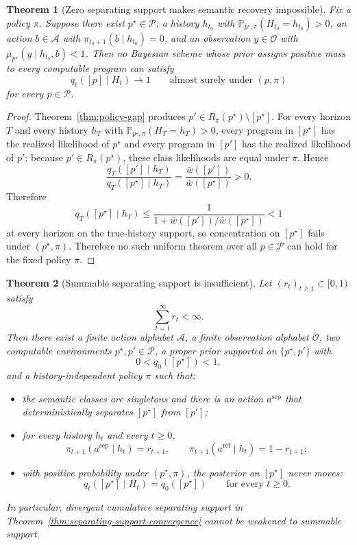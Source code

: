\documentclass[11pt]{article}
\newtheorem{theorem}{Theorem}[section]
\theoremstyle{definition}
\theoremstyle{remark}
\newcommand{\Acal}{\mathcal{A}}
\newcommand{\Ocal}{\mathcal{O}}
\newcommand{\Pcal}{\mathcal{P}}
\newcommand{\Prob}{\mathbb{P}}
\begin{document}
\begin{theorem}[Zero separating support makes semantic recovery impossible]
\label{cor:support-necessary}
Fix a policy $\pi$. Suppose there exist $p^\star\in\Pcal$, a history $h_{t_0}$ with $\Prob_{p^\star,\pi}(H_{t_0}=h_{t_0})>0$, an action $b\in\Acal$ with $\pi_{t_0+1}(b\mid h_{t_0})=0$, and an observation $y\in\Ocal$ with $\mu_{p^\star}(y\mid h_{t_0},b)<1$. Then no Bayesian scheme whose prior assigns positive mass to every computable program can satisfy
\[
q_t([p]\mid H_t)\longrightarrow 1
\qquad\text{almost surely under }(p,\pi)
\]
for every $p\in\Pcal$.
\end{theorem}

\begin{proof}
Theorem~\ref{thm:policy-gap} produces $p'\in R_\pi(p^\star)\setminus[p^\star]$. For every horizon $T$ and every history $h_T$ with $\Prob_{p^\star,\pi}(H_T=h_T)>0$, every program in $[p^\star]$ has the realized likelihood of $p^\star$ and every program in $[p']$ has the realized likelihood of $p'$; because $p'\in R_\pi(p^\star)$, these class likelihoods are equal under $\pi$. Hence
\[
\frac{q_T([p']\mid h_T)}{q_T([p^\star]\mid h_T)}
=
\frac{\bar w([p'])}{\bar w([p^\star])}
>0.
\]
Therefore
\[
q_T([p^\star]\mid h_T)\le \frac{1}{1+\bar w([p'])/\bar w([p^\star])}<1
\]
at every horizon on the true-history support, so concentration on $[p^\star]$ fails under $(p^\star,\pi)$. Therefore no such uniform theorem over all $p\in\Pcal$ can hold for the fixed policy $\pi$.
\end{proof}

\begin{theorem}[Summable separating support is insufficient]
\label{thm:summable-support-insufficient}
Let $(r_t)_{t\ge 1}\subset[0,1)$ satisfy
\[
\sum_{t=1}^{\infty}r_t<\infty.
\]
Then there exist a finite action alphabet $\Acal$, a finite observation alphabet $\Ocal$, two computable environments $p^\star,p'\in\Pcal$, a proper prior supported on $\{p^\star,p'\}$ with
\[
0<q_0([p^\star])<1,
\]
and a history-independent policy $\pi$ such that:
\begin{itemize}
\item[(i)] the semantic classes are singletons and there is an action $a^{\mathrm{sep}}$ that deterministically separates $[p^\star]$ from $[p']$;
\item[(ii)] for every history $h_t$ and every $t\ge 0$,
\[
\pi_{t+1}(a^{\mathrm{sep}}\mid h_t)=r_{t+1},
\qquad
\pi_{t+1}(a^{\mathrm{ref}}\mid h_t)=1-r_{t+1};
\]
\item[(iii)] with positive probability under $(p^\star,\pi)$, the posterior on $[p^\star]$ never moves:
\[
q_t([p^\star]\mid H_t)=q_0([p^\star])
\qquad\text{for every }t\ge 0.
\]
\end{itemize}
In particular, divergent cumulative separating support in Theorem~\ref{thm:separating-support-convergence} cannot be weakened to summable support.
\end{theorem}
\end{document}
